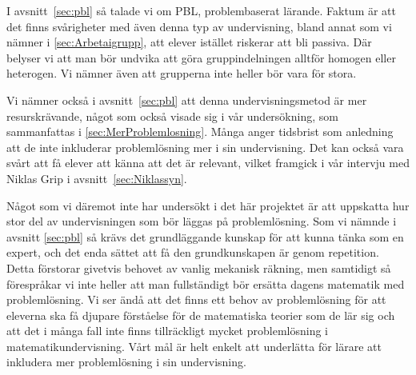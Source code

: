 \textcolor{Mahogany}{I avsnitt~\ref{sec:pbl} så talade vi om PBL, problembaserat lärande. Faktum är att det finns svårigheter med även denna typ av undervisning, bland annat som vi nämner i \ref{sec:Arbetaigrupp}, att elever istället riskerar att bli passiva. Där belyser vi att man bör undvika att göra gruppindelningen alltför homogen eller heterogen. Vi nämner även att grupperna inte heller bör vara för stora.}

\textcolor{Mahogany}{Vi nämner också i avsnitt~\ref{sec:pbl} att denna undervisningsmetod är mer resurskrävande, något som också visade sig i vår undersökning, som sammanfattas i \ref{sec:MerProblemlosning}. Många anger tidsbrist som anledning att de inte inkluderar problemlösning mer i sin undervisning. Det kan också vara svårt att få elever att känna att det är relevant, vilket framgick i vår intervju med Niklas Grip i avsnitt~\ref{sec:Niklassyn}.}

\textcolor{Mahogany}{Något som vi däremot inte har undersökt i det här projektet är att uppskatta hur stor del av undervisningen som bör läggas på problemlösning.} \textcolor{turkos}{Som vi nämnde i avsnitt \ref{sec:pbl} så krävs det grundläggande kunskap för att kunna tänka som en expert, och det enda sättet att få den grundkunskapen är genom repetition. }\textcolor{Mahogany}{Detta förstorar givetvis behovet av vanlig mekanisk räkning, men samtidigt så förespråkar vi inte heller att man fullständigt bör ersätta dagens matematik med problemlösning. Vi ser ändå att det finns ett behov av problemlösning för att eleverna ska få djupare förståelse för de matematiska teorier som de lär sig och att det i många fall inte finns tillräckligt mycket problemlösning i matematikundervisning. Vårt mål är helt enkelt att underlätta för lärare att inkludera mer problemlösning i sin undervisning.}